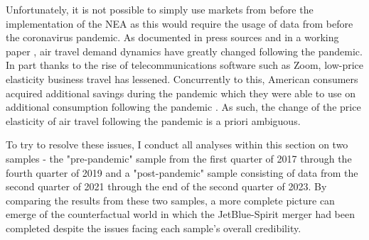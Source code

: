 \documentclass{article}
\begin{document}
	Unfortunately, it is not possible to simply use markets from before the implementation of the NEA as this would require the usage of data from before the coronavirus pandemic. As documented in press sources and in a working paper \citep{ewen_zoom_2023}, air travel demand dynamics have greatly changed following the pandemic. In part thanks to the rise of telecommunications software such as Zoom, low-price elasticity business travel has lessened. Concurrently to this, American consumers acquired additional savings during the pandemic which they were able to use on additional consumption following the pandemic \citep{klitgaard_spending_2023}. As such, the change of the price elasticity of air travel following the pandemic is a priori ambiguous.  
	
 	To try to resolve these issues, I conduct all analyses within this section on two samples - the "pre-pandemic" sample from the first quarter of 2017 through the fourth quarter of  2019 and a "post-pandemic" sample consisting of data from the second quarter of 2021 through the end of the second quarter of 2023. By comparing the results from these two samples, a more complete picture can emerge of the counterfactual world in which the JetBlue-Spirit merger had been completed despite the issues facing each sample's overall credibility.  
 	 	 
 	 
\end{document}
